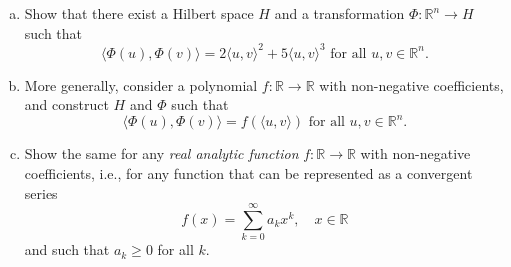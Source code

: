 \begin{problem*}[Exercise 3.7.5]\label{ex3.7.5}
	\begin{enumerate}[(a)]
		\item\label{ex3.7.5:a} Show that there exist a Hilbert space \(H\) and a transformation \(\Phi \colon \mathbb{R} ^n \to H\) such that
		      \[
			      \langle \Phi (u), \Phi (v) \rangle
			      = 2 \langle u, v \rangle ^2 + 5 \langle u, v \rangle ^3
			      \text{ for all } u, v \in \mathbb{R} ^n.
		      \]
		\item\label{ex3.7.5:b} More generally, consider a polynomial \(f \colon \mathbb{R} \to \mathbb{R} \) with non-negative coefficients, and construct \(H\) and \(\Phi \) such that
		      \[
			      \langle \Phi (u), \Phi (v) \rangle
			      = f(\langle u, v \rangle )
			      \text{ for all } u, v \in \mathbb{R} ^n.
		      \]
		\item\label{ex3.7.5:c} Show the same for any \emph{real analytic function} \(f\colon \mathbb{R} \to \mathbb{R} \) with non-negative coefficients, i.e., for any function that can be represented as a convergent series
		      \begin{equation}\label{eq:ex3.7.5}
			      f(x)
			      = \sum_{k=0}^{\infty} a_k x^k, \quad
			      x \in \mathbb{R}
		      \end{equation}
		      and such that \(a_k \geq 0\) for all \(k\).
	\end{enumerate}
\end{problem*}
